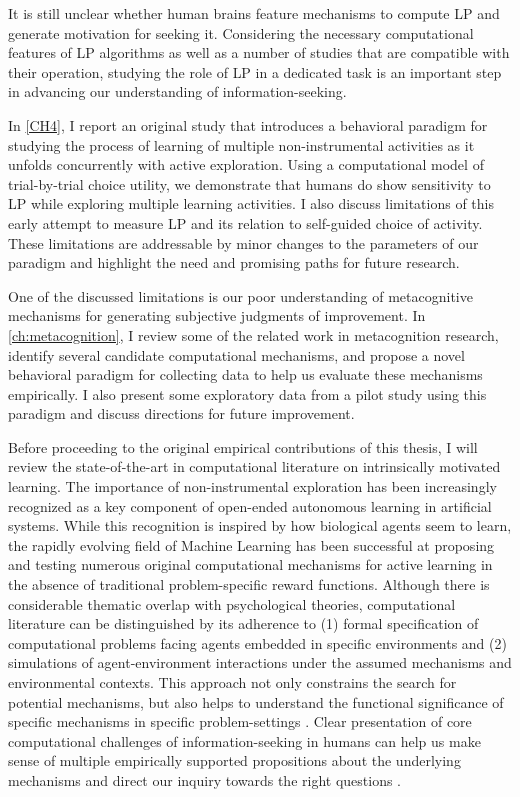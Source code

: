 It is still unclear whether human brains feature mechanisms to compute \ac{LP} and generate motivation for seeking it. Considering the necessary computational features of \ac{LP} algorithms as well as a number of studies that are compatible with their operation, studying the role of \ac{LP} in a dedicated task is an important step in advancing our understanding of information-seeking.

In \cref{CH4}, I report an original study that introduces a behavioral paradigm for studying the process of learning of multiple non-instrumental activities as it unfolds concurrently with active exploration. Using a computational model of trial-by-trial choice utility, we demonstrate that humans do show sensitivity to \ac{LP} while exploring multiple learning activities. I also discuss limitations of this early attempt to measure \ac{LP} and its relation to self-guided choice of activity. These limitations are addressable by minor changes to the parameters of our paradigm and highlight the need and promising paths for future research.

One of the discussed limitations is our poor understanding of metacognitive mechanisms for generating subjective judgments of improvement. In \autoref{ch:metacognition}, I review some of the related work in metacognition research, identify several candidate computational mechanisms, and propose a novel behavioral paradigm for collecting data to help us evaluate these mechanisms empirically. I also present some exploratory data from a pilot study using this paradigm and discuss directions for future improvement.

Before proceeding to the original empirical contributions of this thesis, I will review the state-of-the-art in computational literature on intrinsically motivated learning. The importance of non-instrumental exploration has been increasingly recognized as a key component of open-ended autonomous learning in artificial systems. While this recognition is inspired by how biological agents seem to learn, the rapidly evolving field of Machine Learning has been successful at proposing and testing numerous original computational mechanisms for active learning in the absence of traditional problem-specific reward functions. Although there is considerable thematic overlap with psychological theories, computational literature can be distinguished by its adherence to (1) formal specification of computational problems facing agents embedded in specific environments and (2) simulations of agent-environment interactions under the assumed mechanisms and environmental contexts. This approach not only constrains the search for potential mechanisms, but also helps to understand the functional significance of specific mechanisms in specific problem-settings \parencite[e.g., ][]{lopes_strategic_2012,moulin-frier_exploration_2013}. Clear presentation of core computational challenges of information-seeking in humans can help us make sense of multiple empirically supported propositions about the underlying mechanisms \parencite{dubey_reconciling_2020,brandle_what_2020} and direct our inquiry towards the right questions \parencite{coenen_asking_2019}.